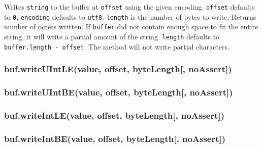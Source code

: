 Writes \texttt{string} to the buffer at \texttt{offset} using the given
encoding. \texttt{offset} defaults to \texttt{0}, \texttt{encoding}
defaults to \texttt{\textquotesingle{}utf8\textquotesingle{}}.
\texttt{length} is the number of bytes to write. Returns number of
octets written. If \texttt{buffer} did not contain enough space to fit
the entire string, it will write a partial amount of the string.
\texttt{length} defaults to \texttt{buffer.length\ -\ offset}. The
method will not write partial characters.

\begin{Shaded}
\begin{Highlighting}[]
 \NormalTok{(}\NormalTok{);}
\NormalTok{(}\NormalTok{, }\NormalTok{);}
 \NormalTok{+ }\NormalTok{(}\NormalTok{, }
\end{Highlighting}
\end{Shaded}

\subsubsection{buf.writeUIntLE(value, offset, byteLength{[},
noAssert{]})}\label{buf.writeuintlevalue-offset-bytelength-noassert}

\subsubsection{buf.writeUIntBE(value, offset, byteLength{[},
noAssert{]})}\label{buf.writeuintbevalue-offset-bytelength-noassert}

\subsubsection{buf.writeIntLE(value, offset, byteLength{[},
noAssert{]})}\label{buf.writeintlevalue-offset-bytelength-noassert}

\subsubsection{buf.writeIntBE(value, offset, byteLength{[},
noAssert{]})}\label{buf.writeintbevalue-offset-bytelength-noassert}

